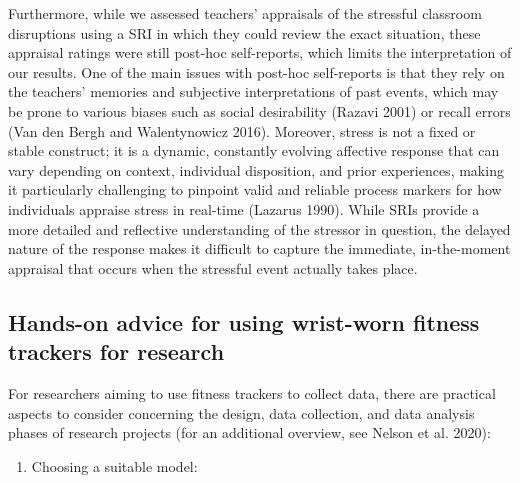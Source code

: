 \documentclass[preprint,
3p]{elsarticle} %
\providecommand{\tightlist}{%
  \setlength{\itemsep}{0pt}\setlength{\parskip}{0pt}}
\begin{document}
Furthermore, while we assessed teachers' appraisals of the stressful
classroom disruptions using a SRI in which they could review the exact
situation, these appraisal ratings were still post-hoc self-reports,
which limits the interpretation of our results. One of the main issues
with post-hoc self-reports is that they rely on the teachers' memories
and subjective interpretations of past events, which may be prone to
various biases such as social desirability (Razavi 2001) or recall
errors (Van den Bergh and Walentynowicz 2016). Moreover, stress is not a
fixed or stable construct; it is a dynamic, constantly evolving
affective response that can vary depending on context, individual
disposition, and prior experiences, making it particularly challenging
to pinpoint valid and reliable process markers for how individuals
appraise stress in real-time (Lazarus 1990). While SRIs provide a more
detailed and reflective understanding of the stressor in question, the
delayed nature of the response makes it difficult to capture the
immediate, in-the-moment appraisal that occurs when the stressful event
actually takes place.

\subsection{Hands-on advice for using wrist-worn fitness trackers for
research}\label{hands-on-advice-for-using-wrist-worn-fitness-trackers-for-research}

For researchers aiming to use fitness trackers to collect data, there
are practical aspects to consider concerning the design, data
collection, and data analysis phases of research projects (for an
additional overview, see Nelson et al. 2020):

\begin{enumerate}
\def\labelenumi{\arabic{enumi})}
\tightlist
\item
  Choosing a suitable model:
\end{enumerate}
\end{document}
